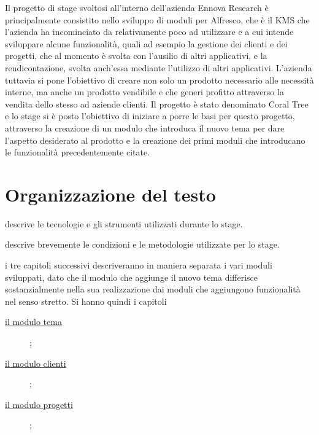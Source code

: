 Il progetto di stage svoltosi all’interno dell’azienda Ennova Research è principalmente consistito nello sviluppo di moduli per Alfresco, che è il \gls{KMS} che l'azienda ha incominciato da relativamente poco ad utilizzare e a cui intende sviluppare alcune funzionalità, quali ad esempio la gestione dei clienti e dei progetti, che al momento è svolta con l'ausilio di altri applicativi, e la rendicontazione, svolta anch'essa mediante l'utilizzo di altri applicativi.
L'azienda tuttavia si pone l'obiettivo di creare non solo un prodotto necessario alle necessità interne, ma anche un prodotto vendibile e che generi profitto attraverso la vendita dello stesso ad aziende clienti. Il progetto è stato denominato Coral Tree e lo stage si è posto l'obiettivo di iniziare a porre le basi per questo progetto, attraverso la creazione di un modulo che introduca il nuovo tema per dare l'aspetto desiderato al prodotto e la creazione dei primi moduli che introducano le funzionalità precedentemente citate.

\section{Organizzazione del testo}
\begin{description}
    \item[{\hyperref[cap:tecnologie-strumenti]{Il secondo capitolo}}] descrive le tecnologie e gli strumenti utilizzati durante lo stage.    
    \item[{\hyperref[cap:descrizione-stage]{Il terzo capitolo}}] descrive brevemente le condizioni e le metodologie utilizzate per lo stage.
		\item i tre capitoli successivi descriveranno in maniera separata i vari moduli sviluppati, dato che il modulo che aggiunge il nuovo tema differisce
		sostanzialmente nella sua realizzazione dai moduli che aggiungono funzionalità nel senso stretto.
		Si hanno quindi i capitoli
		\begin{description}
		\item[{\hyperref[cap:modulo-tema]{il modulo tema}}];
		\item[{\hyperref[cap:modulo-clienti]{il modulo clienti}}];
		\item[{\hyperref[cap:modulo-progetti]{ il modulo progetti}}];
		\end{description}
\end{description}